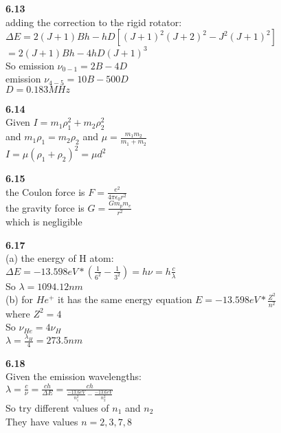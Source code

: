 \documentclass{article}
\begin{document}
\textbf{6.13}\\
adding the correction to the rigid rotator:\\
$\Delta E = 2(J+1)Bh - hD[(J+1)^2(J+2)^2 - J^2(J+1)^2]$\\
$=2(J+1)Bh - 4hD(J+1)^3$\\
So emission $\nu_{0-1} = 2B - 4D$\\
emission $\nu_{4-5} = 10B - 500D$\\
$D = 0.183MHz$\\
\newline

\textbf{6.14}\\
Given $I = m_1\rho_1^2+m_2\rho_2^2$\\
and $m_1\rho_1 = m_2\rho_2$ and $\mu = \frac{m_1m_2}{m_1+m_2}$\\
$I = \mu (\rho_1+\rho_2)^2 = \mu d^2$\\
\newline

\textbf{6.15}\\
the Coulon force is $F = \frac{e^2}{4\pi \epsilon_0 r^2}$\\
the gravity force is $G = \frac{Gm_pm_e}{r^2}$\\
which is negligible\\
\newline

\textbf{6.17}\\
(a) the energy of H atom:\\
$\Delta E = -13.598eV * (\frac{1}{6^2} - \frac{1}{3^2}) = h\nu = h\frac{c}{\lambda}$\\
So $\lambda = 1094.12nm$\\
(b) for $He^{+}$ it has the same energy equation $E = -13.598eV*\frac{Z^2}{n^2}$\\
where $Z^2 = 4$\\
So $\nu_{He} = 4\nu_{H}$\\
$\lambda = \frac{\lambda_{H}}{4} = 273.5nm$\\
\newline

\textbf{6.18}\\
Given the emission wavelengths:\\
$\lambda = \frac{c}{\nu} = \frac{ch}{\Delta E} = \frac{ch}{\frac{-13.6eV}{n_1^2} - \frac{-13.6eV}{n_2^2}}$\\
So try different values of $n_1$ and $n_2$\\
They have values $n = 2,3,7,8$\\
\newline
\end{document}
